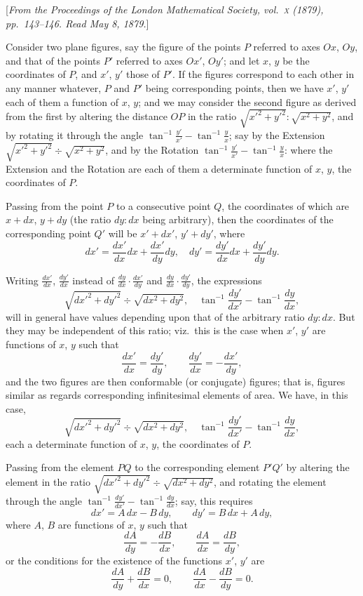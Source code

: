 \documentclass[12pt,a4paper]{article}
\theoremstyle{plain}
\begin{document}
[\textit{From the Proceedings of the London Mathematical Society, vol.~\textsc{x} (1879), pp.~143--146.
Read May 8, 1879.}]

Consider two plane figures, say the figure of the points $P$ referred
to axes $Ox$, $Oy$, and that of the points $P'$ referred to axes $Ox'$, $Oy'$;
and let $x$, $y$ be the coordinates of $P$, and $x'$, $y'$ those of $P'$.
If the figures correspond to each other in any manner whatever,
$P$ and $P'$ being corresponding points, then we have $x'$, $y'$ each of
them a function of $x$, $y$; and we may consider the second figure as
derived from the first by altering the distance $OP$ in the ratio
$\sqrt{x'^2+y'^2}:\sqrt{x^2+y^2}$, and by rotating it through the angle
$\tan^{-1}\frac{y'}{x'}-\tan^{-1}\frac{y}{x}$; say by the Extension
$\sqrt{x'^2+y'^2}\div\sqrt{x^2+y^2}$, and by the Rotation
$\tan^{-1}\frac{y'}{x'}-\tan^{-1}\frac{y}{x}$: where the Extension and the Rotation
are each of them a determinate function of $x$, $y$, the coordinates of $P$.

Passing from the point $P$ to a consecutive point $Q$, the coordinates
of which are $x+dx$, $y+dy$ (the ratio $dy:dx$ being arbitrary), then the
coordinates of the corresponding point $Q'$ will be $x'+dx'$, $y'+dy'$,
where
\[
dx' = \frac{dx'}{dx}dx + \frac{dx'}{dy}dy,\quad
dy' = \frac{dy'}{dx}dx + \frac{dy'}{dy}dy.
\]

Writing $\frac{dx'}{dx}$, $\frac{dy'}{dx}$ instead of $\frac{dy}{dx}\cdot\frac{dx'}{dy}$ and
$\frac{dy}{dx}\cdot\frac{dy'}{dy}$, the expressions
\[
\sqrt{dx'^2+dy'^2}\div\sqrt{dx^2+dy^2},\quad
\tan^{-1}\frac{dy'}{dx'}-\tan^{-1}\frac{dy}{dx},
\]
will in general have values depending upon that of the arbitrary ratio $dy:dx$.
But they may be independent of this ratio; viz.~this is the case when
$x'$, $y'$ are functions of $x$, $y$ such that
\[
\frac{dx'}{dx} = \frac{dy'}{dy},\qquad \frac{dy'}{dx} = -\frac{dx'}{dy},
\]
and the two figures are then conformable (or conjugate) figures; that is,
figures similar as regards corresponding infinitesimal elements of area.
We have, in this case,
\[
\sqrt{dx'^2+dy'^2}\div\sqrt{dx^2+dy^2},\quad
\tan^{-1}\frac{dy'}{dx'}-\tan^{-1}\frac{dy}{dx},
\]
each a determinate function of $x$, $y$, the coordinates of $P$.

Passing from the element $PQ$ to the corresponding element $P'Q'$
by altering the element in the ratio
$\sqrt{dx'^2+dy'^2}\div\sqrt{dx^2+dy^2}$, and rotating the element through
the angle $\tan^{-1}\frac{dy'}{dx'}-\tan^{-1}\frac{dy}{dx}$; say, this requires
\[
dx' = A\,dx - B\,dy,\qquad dy' = B\,dx + A\,dy,
\]
where $A$, $B$ are functions of $x$, $y$ such that
\[
\frac{dA}{dy} = -\frac{dB}{dx},\qquad \frac{dA}{dx} = \frac{dB}{dy},
\]
or the conditions for the existence of the functions $x'$, $y'$ are
\[
\frac{dA}{dy}+\frac{dB}{dx}=0,\qquad \frac{dA}{dx}-\frac{dB}{dy}=0.
\]
\end{document}
